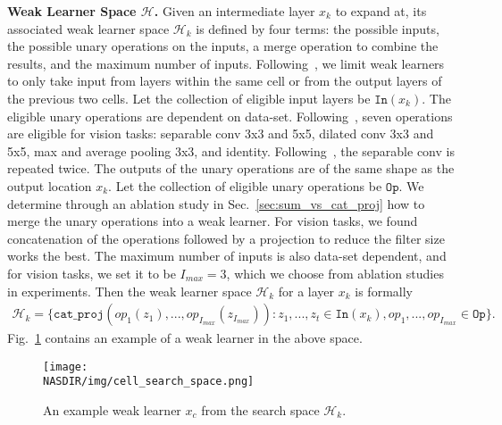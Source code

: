 \textbf{Weak Learner Space $\mathcal{H}$.}
Given an intermediate layer $x_{k}$ to expand at, its associated weak learner space $\mathcal{H}_{k}$ is defined by four terms: the possible inputs, the
possible unary operations on the inputs, a merge operation to combine the results, and the maximum number of inputs. 
Following~\citep{NASCell,Real2018RegularizedEF,Liu2018DARTSDA}, we limit weak learners to only take input from layers within the same cell or from the output layers of the previous 
two cells. Let the collection of eligible input layers be $\texttt{In}(x_{k})$. 
The eligible unary operations are dependent on data-set. Following~\citep{Liu2018DARTSDA}, seven operations are eligible for vision tasks:  
separable conv 3x3 and 5x5, dilated conv 3x3 and 5x5, max and average pooling 3x3, and identity. Following~\citep{NASCell,Real2018RegularizedEF}, the separable conv is 
repeated twice. The outputs of the unary operations are of the same shape 
as the output location $x_k$. 
Let the collection of eligible unary operations be $\texttt{Op}$.
We determine through an ablation study in Sec.~\ref{sec:sum_vs_cat_proj} how to merge the unary operations into a weak learner. For vision tasks, we found 
concatenation of the operations followed by a projection to reduce the filter size works the best. 
The maximum number of inputs is also data-set dependent, and for vision tasks, we set it to be $I_{max} = 3$, which we choose from ablation studies in experiments.
Then the weak learner space $\mathcal{H}_{k}$ for a layer $x_{k}$ is formally 
\begin{align}
\mathcal{H}_{k} = \{ \texttt{cat\_proj}( op_1(z_1), ..., op_{I_{max}}(z_{I_{max}})) : z_1, ..., z_t \in \texttt{In}(x_{k}), op_1, ..., op_{I_{max}} \in \texttt{Op}  \}.
\end{align}
Fig.~\ref{fig:cell_search_space} contains an example of a weak learner in the above space. 
\begin{figure}
\centering
\texttt{[image: \\NASDIR/img/cell\_search\_space.png]}
\caption{An example weak learner $x_c$ from the search space $\mathcal{H}_k$.}
\label{fig:cell_search_space}
\end{figure}


